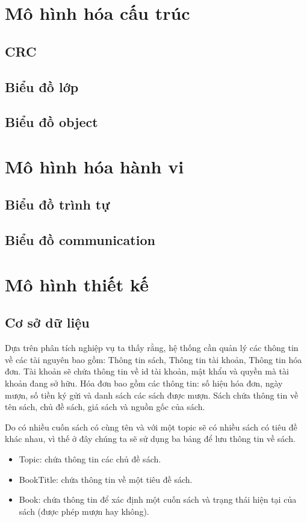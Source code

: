 \documentclass[12pt]{report}
\begin{document}
\section{Mô hình hóa cấu trúc}

\subsection{CRC}
\renewcommand{\arraystretch}{1.5}



\subsection{Biểu đồ lớp}
\subsection{Biểu đồ object}

\section{Mô hình hóa hành vi}
\subsection{Biểu đồ trình tự}
\subsection{Biểu đồ communication}

\section{Mô hình thiết kế}
\subsection{Cơ sở dữ liệu}
Dựa trên phân tích nghiệp vụ ta thấy rằng, hệ thống cần quản lý các thông 
tin về các tài nguyên bao gồm: Thông tin sách, Thông tin tài khoản, 
Thông tin hóa đơn.
Tài khoản sẽ chứa thông tin về id tài khoản, mật khẩu và quyền mà 
tài khoản đang sở hữu.
Hóa đơn bao gồm các thông tin: số hiệu hóa đơn, ngày mượn, 
số tiền ký gửi và danh sách các sách được mượn.
Sách chứa thông tin về tên sách, chủ đề sách, 
giá sách và nguồn gốc của sách. 

Do có nhiều cuốn sách có cùng tên và với một topic sẽ có nhiều sách có tiêu đề khác nhau,
vì thế ở đây chúng ta sẽ sử dụng ba bảng để lưu thông tin về sách. 
\begin{itemize}
      \item Topic: chứa thông tin các chủ đề sách.
\item BookTitle: chứa thông tin về một tiêu đề sách.
\item Book: chứa thông tin để xác định một cuốn sách và trạng thái 
hiện tại của sách (được phép mượn hay không).

\end{itemize}
\end{document}
